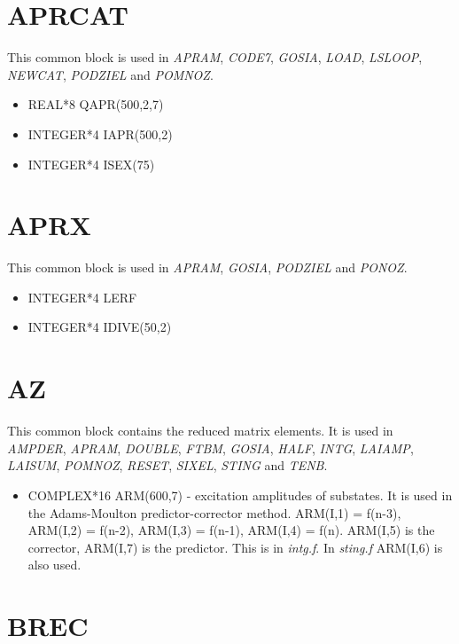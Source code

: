 \section{APRCAT}

This common block is used in {\em APRAM}, {\em CODE7}, {\em GOSIA}, {\em
LOAD}, {\em LSLOOP}, {\em NEWCAT}, {\em PODZIEL} and {\em POMNOZ}.

\begin{itemize}
\item REAL*8 QAPR(500,2,7)
\item INTEGER*4 IAPR(500,2)
\item INTEGER*4 ISEX(75)
\end{itemize}

\section{APRX}

This common block is used in {\em APRAM}, {\em GOSIA}, {\em PODZIEL} and
{\em PONOZ}.

\begin{itemize}
\item INTEGER*4 LERF
\item INTEGER*4 IDIVE(50,2)
\end{itemize}

\section{AZ}

This common block contains the reduced matrix elements. It is used in {\em
AMPDER}, {\em APRAM}, {\em DOUBLE}, {\em FTBM}, {\em GOSIA}, {\em HALF},
{\em INTG}, {\em LAIAMP}, {\em LAISUM}, {\em POMNOZ}, {\em RESET}, {\em
SIXEL}, {\em STING} and {\em TENB}.

\begin{itemize}
\item COMPLEX*16 ARM(600,7) - excitation amplitudes of substates. It is used
in the Adams-Moulton predictor-corrector method. ARM(I,1) = f(n-3), ARM(I,2)
= f(n-2), ARM(I,3) = f(n-1), ARM(I,4) = f(n). ARM(I,5) is the corrector,
ARM(I,7) is the predictor. This is in {\em intg.f}. In {\em sting.f}
ARM(I,6) is also used.
\end{itemize}

\section{BREC}

